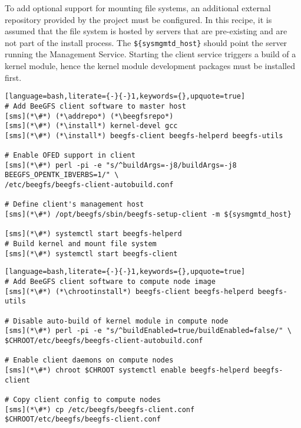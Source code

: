To add optional support for mounting \beegfs{} file systems, an 
additional external \pkgmgr{} repository provided by the \beegfs{} project must be 
configured.  In this recipe, it is
assumed that the file system is hosted by servers that are pre-existing
and are not part of the install process. The \texttt{\$\{sysmgmtd\_host\}} should
point the server running the \beegfs{} Management Service. Starting the client service triggers
a build of a kernel module, hence the kernel module development packages must be
installed first.

\begin{lstlisting}[language=bash,literate={-}{-}1,keywords={},upquote=true]
# Add BeeGFS client software to master host
[sms](*\#*) (*\addrepo*) (*\beegfsrepo*)
[sms](*\#*) (*\install*) kernel-devel gcc
[sms](*\#*) (*\install*) beegfs-client beegfs-helperd beegfs-utils

# Enable OFED support in client
[sms](*\#*) perl -pi -e "s/^buildArgs=-j8/buildArgs=-j8 BEEGFS_OPENTK_IBVERBS=1/" \ 
/etc/beegfs/beegfs-client-autobuild.conf

# Define client's management host
[sms](*\#*) /opt/beegfs/sbin/beegfs-setup-client -m ${sysmgmtd_host}

[sms](*\#*) systemctl start beegfs-helperd
# Build kernel and mount file system
[sms](*\#*) systemctl start beegfs-client
\end{lstlisting}

\begin{lstlisting}[language=bash,literate={-}{-}1,keywords={},upquote=true]
# Add BeeGFS client software to compute node image
[sms](*\#*) (*\chrootinstall*) beegfs-client beegfs-helperd beegfs-utils

# Disable auto-build of kernel module in compute node
[sms](*\#*) perl -pi -e "s/^buildEnabled=true/buildEnabled=false/" \ 
$CHROOT/etc/beegfs/beegfs-client-autobuild.conf

# Enable client daemons on compute nodes
[sms](*\#*) chroot $CHROOT systemctl enable beegfs-helperd beegfs-client

# Copy client config to compute nodes
[sms](*\#*) cp /etc/beegfs/beegfs-client.conf $CHROOT/etc/beegfs/beegfs-client.conf
\end{lstlisting}
